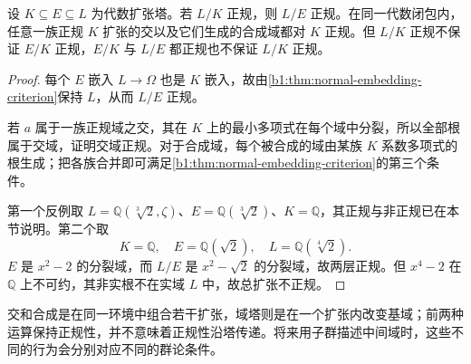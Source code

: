 \begin{proposition}\label{b1:prop:normal-tower-behavior}
	设 \(K\subseteq E\subseteq L\) 为代数扩张塔。若 \(L/K\) 正规，则 \(L/E\) 正规。在同一代数闭包内，任意一族正规 \(K\) 扩张的交以及它们生成的合成域都对 \(K\) 正规。但 \(L/K\) 正规不保证 \(E/K\) 正规，\(E/K\) 与 \(L/E\) 都正规也不保证 \(L/K\) 正规。
\end{proposition}
\begin{proof}
	每个 \(E\) 嵌入 \(L\rightarrow\Omega\) 也是 \(K\) 嵌入，故由\cref{b1:thm:normal-embedding-criterion}保持 \(L\)，从而 \(L/E\) 正规。

	若 \(a\) 属于一族正规域之交，其在 \(K\) 上的最小多项式在每个域中分裂，所以全部根属于交域，证明交域正规。对于合成域，每个被合成的域由某族 \(K\) 系数多项式的根生成；把各族合并即可满足\cref{b1:thm:normal-embedding-criterion}的第三个条件。

	第一个反例取 \(L=\mathbb Q(\sqrt[3]2,\zeta)\)、\(E=\mathbb Q(\sqrt[3]2)\)、\(K=\mathbb Q\)，其正规与非正规已在本节说明。第二个取
	\[
		K=\mathbb Q,\quad E=\mathbb Q(\sqrt2),\quad L=\mathbb Q(\sqrt[4]2).
	\]
	\(E\) 是 \(x^2-2\) 的分裂域，而 \(L/E\) 是 \(x^2-\sqrt2\) 的分裂域，故两层正规。但 \(x^4-2\) 在 \(\mathbb Q\) 上不可约，其非实根不在实域 \(L\) 中，故总扩张不正规。
\end{proof}
交和合成是在同一环境中组合若干扩张，域塔则是在一个扩张内改变基域；前两种运算保持正规性，并不意味着正规性沿塔传递。将来用子群描述中间域时，这些不同的行为会分别对应不同的群论条件。
